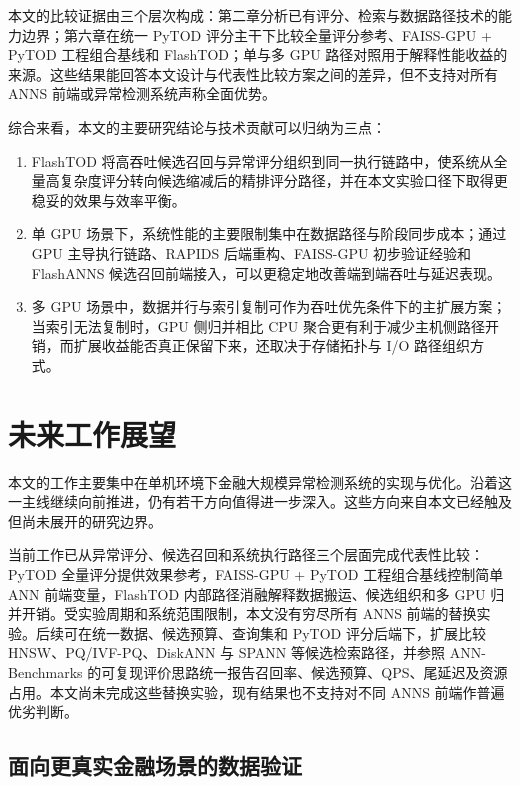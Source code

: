 本文的比较证据由三个层次构成：第二章分析已有评分、检索与数据路径技术的能力边界；第六章在统一 PyTOD 评分主干下比较全量评分参考、FAISS-GPU + PyTOD 工程组合基线和 FlashTOD；单与多 GPU 路径对照用于解释性能收益的来源。这些结果能回答本文设计与代表性比较方案之间的差异，但不支持对所有 ANNS 前端或异常检测系统声称全面优势。

综合来看，本文的主要研究结论与技术贡献可以归纳为三点：
\begin{enumerate}
  \item FlashTOD 将高吞吐候选召回与异常评分组织到同一执行链路中，使系统从全量高复杂度评分转向候选缩减后的精排评分路径，并在本文实验口径下取得更稳妥的效果与效率平衡。
  \item 单 GPU 场景下，系统性能的主要限制集中在数据路径与阶段同步成本；通过 GPU 主导执行链路、RAPIDS 后端重构、FAISS-GPU 初步验证经验和 FlashANNS 候选召回前端接入，可以更稳定地改善端到端吞吐与延迟表现。
  \item 多 GPU 场景中，数据并行与索引复制可作为吞吐优先条件下的主扩展方案；当索引无法复制时，GPU 侧归并相比 CPU 聚合更有利于减少主机侧路径开销，而扩展收益能否真正保留下来，还取决于存储拓扑与 I/O 路径组织方式。
\end{enumerate}

\section{未来工作展望}

本文的工作主要集中在单机环境下金融大规模异常检测系统的实现与优化。沿着这一主线继续向前推进，仍有若干方向值得进一步深入。这些方向来自本文已经触及但尚未展开的研究边界。

当前工作已从异常评分、候选召回和系统执行路径三个层面完成代表性比较：PyTOD 全量评分提供效果参考，FAISS-GPU + PyTOD 工程组合基线控制简单 ANN 前端变量，FlashTOD 内部路径消融解释数据搬运、候选组织和多 GPU 归并开销。受实验周期和系统范围限制，本文没有穷尽所有 ANNS 前端的替换实验。后续可在统一数据、候选预算、查询集和 PyTOD 评分后端下，扩展比较 HNSW、PQ/IVF-PQ、DiskANN 与 SPANN 等候选检索路径\citep{malkov2020hnsw,jegou2011pq,subramanya2019diskann,chen2021spann}，并参照 ANN-Benchmarks 的可复现评价思路统一报告召回率、候选预算、QPS、尾延迟及资源占用\citep{aumuller2020annbenchmarks}。本文尚未完成这些替换实验，现有结果也不支持对不同 ANNS 前端作普遍优劣判断。

\subsection{面向更真实金融场景的数据验证}

